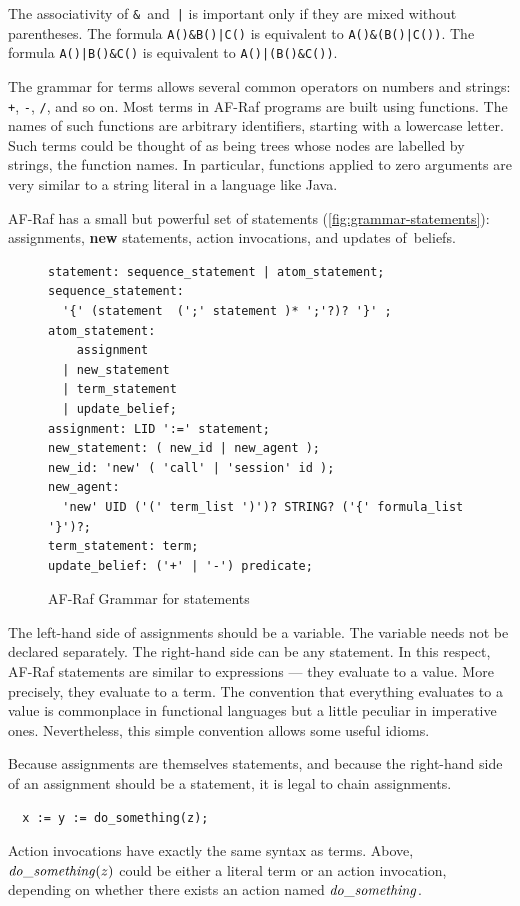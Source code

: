 \documentclass[a4paper,12pt,oneside,fleqn]{book} %
\begin{document}
\begin{example}
The associativity of \verb+&+~and~\verb+|+ is important only if they are
mixed without parentheses.  The formula \verb+A()&B()|C()+ is equivalent to
\verb+A()&(B()|C())+.  The formula \verb+A()|B()&C()+ is equivalent to
\verb+A()|(B()&C())+.
\end{example}

The grammar for terms allows several common operators on numbers and
strings: \verb-+-, \verb+-+, \verb+/+, and so on. Most terms in AF-Raf
programs are built using functions. The names of such functions are
arbitrary identifiers, starting with a lowercase letter. Such terms could
be thought of as being trees whose nodes are labelled by strings, the
function names. In particular, functions applied to zero arguments are very
similar to a string literal in a language like Java.

AF-Raf has a small but powerful set of statements
(\autoref{fig:grammar-statements}): assignments, {\bf new} statements,
action invocations, and updates of~beliefs.

\begin{figure}\footnotesize %
\begin{verbatim}
statement: sequence_statement | atom_statement;
sequence_statement:
  '{' (statement  (';' statement )* ';'?)? '}' ;
atom_statement:
    assignment
  | new_statement
  | term_statement
  | update_belief;
assignment: LID ':=' statement;
new_statement: ( new_id | new_agent );
new_id: 'new' ( 'call' | 'session' id );
new_agent:
  'new' UID ('(' term_list ')')? STRING? ('{' formula_list '}')?;
term_statement: term;
update_belief: ('+' | '-') predicate;
\end{verbatim}
\caption{AF-Raf Grammar for statements}
\label{fig:grammar-statements}
\end{figure} %

The left-hand side of assignments should be a variable. The variable needs
not be declared separately.  The right-hand side can be any statement.  In
this respect, AF-Raf statements are similar to expressions --- they
evaluate to a value. More precisely, they evaluate to a term. The
convention that everything evaluates to a value is commonplace in
functional languages but a little peculiar in imperative ones.
Nevertheless, this simple convention allows some useful idioms.

\begin{example}
Because assignments are themselves statements, and because the right-hand
side of an assignment should be a statement, it is legal to chain
assignments.
\begin{verbatim}
  x := y := do_something(z);
\end{verbatim}
Action invocations have exactly the same syntax as terms. Above, ${\it
do\_something}(z)$ could be either a literal term or an action invocation,
depending on whether there exists an action named ${\it do\_something}$.
\end{example}
\end{document}
